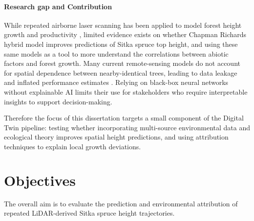 \documentclass[logo,msc,ai]{infthesis}           %
\begin{document}
\paragraph*{Research gap and Contribution}
While repeated airborne laser scanning has been applied to model forest height growth and productivity \cite{janiec2023Development_C1_SS}, limited evidence exists on whether Chapman Richards hybrid model improves predictions of Sitka spruce top height, and using these same models as a tool to more understand the correlations between abiotic factors and forest growth. Many current remote-sensing models do not account for spatial dependence between nearby-identical trees, leading to data leakage and inflated performance estimates \cite{Karasiak2022Spatial_C5_EVAL, ploton2020Spatial_C5_EVAL, lynch2025Digital_C4_NN}. Relying on black-box neural networks without explainable AI limits their use for stakeholders who require interpretable insights to support decision-making.

Therefore the focus of this dissertation targets a small component of the Digital Twin pipeline: testing whether incorporating multi-source environmental data and ecological theory improves spatial height predictions, and using attribution techniques to explain local growth deviations.


\section{Objectives}
The overall aim is to evaluate the prediction and environmental attribution of repeated LiDAR-derived Sitka spruce height trajectories. 
\end{document}
